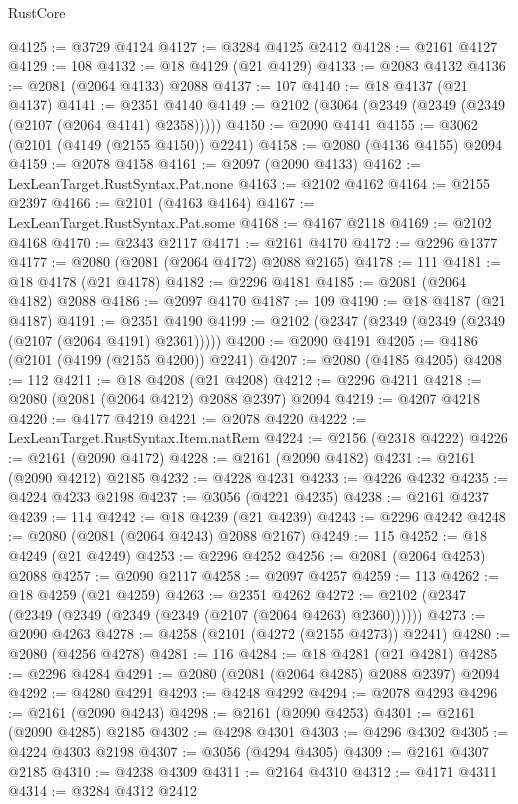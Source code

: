 \begin{lexlean}{RustCore}
\begin{coremodule}
@4125 := @3729 @4124
@4127 := @3284 @4125 @2412
@4128 := @2161 @4127
@4129 := 108
@4132 := @18 @4129 (@21 @4129)
@4133 := @2083 @4132
@4136 := @2081 (@2064 @4133) @2088
@4137 := 107
@4140 := @18 @4137 (@21 @4137)
@4141 := @2351 @4140
@4149 := @2102 (@3064 (@2349 (@2349 (@2349 (@2107 (@2064 @4141) @2358)))))
@4150 := @2090 @4141
@4155 := @3062 (@2101 (@4149 (@2155 @4150)) @2241)
@4158 := @2080 (@4136 @4155) @2094
@4159 := @2078 @4158
@4161 := @2097 (@2090 @4133)
@4162 := LexLeanTarget.RustSyntax.Pat.none
@4163 := @2102 @4162
@4164 := @2155 @2397
@4166 := @2101 (@4163 @4164)
@4167 := LexLeanTarget.RustSyntax.Pat.some
@4168 := @4167 @2118
@4169 := @2102 @4168
@4170 := @2343 @2117
@4171 := @2161 @4170
@4172 := @2296 @1377
@4177 := @2080 (@2081 (@2064 @4172) @2088 @2165)
@4178 := 111
@4181 := @18 @4178 (@21 @4178)
@4182 := @2296 @4181
@4185 := @2081 (@2064 @4182) @2088
@4186 := @2097 @4170
@4187 := 109
@4190 := @18 @4187 (@21 @4187)
@4191 := @2351 @4190
@4199 := @2102 (@2347 (@2349 (@2349 (@2349 (@2107 (@2064 @4191) @2361)))))
@4200 := @2090 @4191
@4205 := @4186 (@2101 (@4199 (@2155 @4200)) @2241)
@4207 := @2080 (@4185 @4205)
@4208 := 112
@4211 := @18 @4208 (@21 @4208)
@4212 := @2296 @4211
@4218 := @2080 (@2081 (@2064 @4212) @2088 @2397) @2094
@4219 := @4207 @4218
@4220 := @4177 @4219
@4221 := @2078 @4220
@4222 := LexLeanTarget.RustSyntax.Item.natRem
@4224 := @2156 (@2318 @4222)
@4226 := @2161 (@2090 @4172)
@4228 := @2161 (@2090 @4182)
@4231 := @2161 (@2090 @4212) @2185
@4232 := @4228 @4231
@4233 := @4226 @4232
@4235 := @4224 @4233 @2198
@4237 := @3056 (@4221 @4235)
@4238 := @2161 @4237
@4239 := 114
@4242 := @18 @4239 (@21 @4239)
@4243 := @2296 @4242
@4248 := @2080 (@2081 (@2064 @4243) @2088 @2167)
@4249 := 115
@4252 := @18 @4249 (@21 @4249)
@4253 := @2296 @4252
@4256 := @2081 (@2064 @4253) @2088
@4257 := @2090 @2117
@4258 := @2097 @4257
@4259 := 113
@4262 := @18 @4259 (@21 @4259)
@4263 := @2351 @4262
@4272 := @2102 (@2347 (@2349 (@2349 (@2349 (@2349 (@2107 (@2064 @4263) @2360))))))
@4273 := @2090 @4263
@4278 := @4258 (@2101 (@4272 (@2155 @4273)) @2241)
@4280 := @2080 (@4256 @4278)
@4281 := 116
@4284 := @18 @4281 (@21 @4281)
@4285 := @2296 @4284
@4291 := @2080 (@2081 (@2064 @4285) @2088 @2397) @2094
@4292 := @4280 @4291
@4293 := @4248 @4292
@4294 := @2078 @4293
@4296 := @2161 (@2090 @4243)
@4298 := @2161 (@2090 @4253)
@4301 := @2161 (@2090 @4285) @2185
@4302 := @4298 @4301
@4303 := @4296 @4302
@4305 := @4224 @4303 @2198
@4307 := @3056 (@4294 @4305)
@4309 := @2161 @4307 @2185
@4310 := @4238 @4309
@4311 := @2164 @4310
@4312 := @4171 @4311
@4314 := @3284 @4312 @2412

\end{coremodule}
\end{lexlean}
